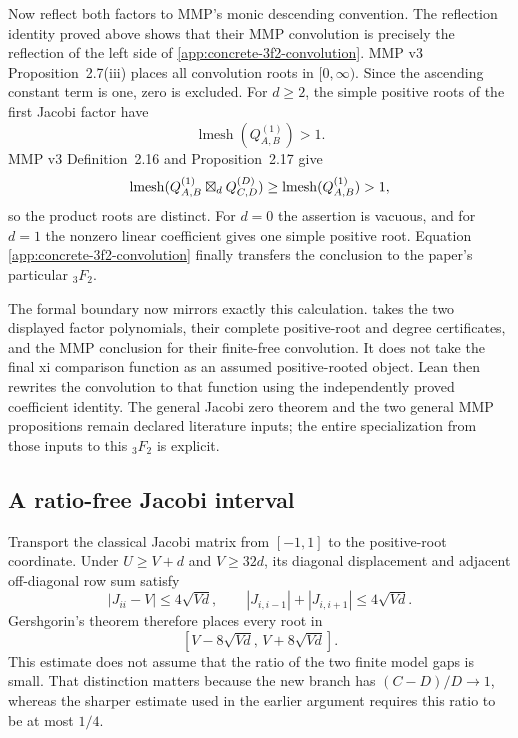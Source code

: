Now reflect both factors to MMP's monic descending convention.  The reflection
identity proved above shows that their MMP convolution is precisely the
reflection of the left side of
\eqref{app:concrete-3f2-convolution}.  MMP v3 Proposition~2.7(iii) places all
convolution roots in $[0,\infty)$.  Since the ascending constant term is one,
zero is excluded.  For $d\ge2$, the simple positive roots of the first Jacobi
factor have
\[
 \operatorname{lmesh}(Q_{A,B}^{(1)})>1.
\]
MMP v3 Definition~2.16 and Proposition~2.17 give
\[
 \operatorname{lmesh}(Q_{A,B}^{(1)}\boxtimes_d Q_{C,D}^{(D)})
 \ge \operatorname{lmesh}(Q_{A,B}^{(1)})>1,
\]
so the product roots are distinct.  For $d=0$ the assertion is vacuous, and
for $d=1$ the nonzero linear coefficient gives one simple positive root.
Equation \eqref{app:concrete-3f2-convolution} finally transfers the conclusion
to the paper's particular ${}_3F_2$.

{\setlength{\emergencystretch}{1em}
The formal boundary now mirrors exactly this calculation.
{\small{}} takes the two displayed factor polynomials,
their complete positive-root and degree certificates, and the MMP conclusion
for their finite-free convolution.  It does not take the final xi comparison
function as an assumed positive-rooted object.
Lean then rewrites the convolution to that function using the independently
proved coefficient identity.  The general Jacobi zero theorem and the two
general MMP propositions remain declared literature inputs; the entire
specialization from those inputs to this ${}_3F_2$ is explicit.
\par}

\subsection{A ratio-free Jacobi interval}

Transport the classical Jacobi matrix from $[-1,1]$ to the positive-root
coordinate.  Under $U\ge V+d$ and $V\ge32d$, its diagonal displacement and
adjacent off-diagonal row sum satisfy
\[
 |J_{ii}-V|\le4\sqrt{Vd},\qquad
 |J_{i,i-1}|+|J_{i,i+1}|\le4\sqrt{Vd}.
\]
Gershgorin's theorem therefore places every root in
\begin{equation}\label{app:jacobi-eight}
 [V-8\sqrt{Vd},\,V+8\sqrt{Vd}].
\end{equation}
This estimate does not assume that the ratio of the two finite model gaps is
small.  That distinction matters because the new branch has
$(C-D)/D\to1$, whereas the sharper estimate used in the earlier argument
requires this ratio to be at most $1/4$.

